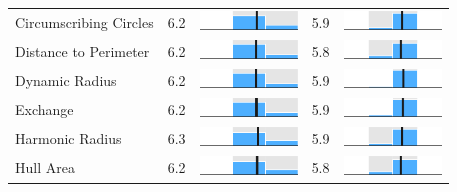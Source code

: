 \begin{table}
\begin{tabular}{l rm{7em} rm{7em}}
Circumscribing Circles &   6.2 &        \includegraphics[width=7em]{mini_hist/MD_2008_reock} &   5.9 &        \includegraphics[width=7em]{mini_hist/MD_2016_reock} \\
Distance to Perimeter  &   6.2 &     \includegraphics[width=7em]{mini_hist/MD_2008_rohrbach} &   5.8 &     \includegraphics[width=7em]{mini_hist/MD_2016_rohrbach} \\
Dynamic Radius         &   6.2 &   \includegraphics[width=7em]{mini_hist/MD_2008_dyn_radius} &   5.9 &   \includegraphics[width=7em]{mini_hist/MD_2016_dyn_radius} \\
Exchange               &   6.2 &     \includegraphics[width=7em]{mini_hist/MD_2008_exchange} &   5.9 &     \includegraphics[width=7em]{mini_hist/MD_2016_exchange} \\
Harmonic Radius        &   6.3 &  \includegraphics[width=7em]{mini_hist/MD_2008_harm_radius} &   5.9 &  \includegraphics[width=7em]{mini_hist/MD_2016_harm_radius} \\
Hull Area              &   6.2 &       \includegraphics[width=7em]{mini_hist/MD_2008_hull_a} &   5.8 &       \includegraphics[width=7em]{mini_hist/MD_2016_hull_a} \\

\end{tabular}
\end{table}
